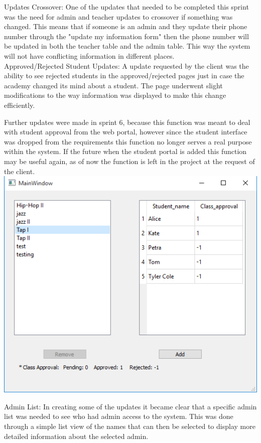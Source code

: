 Updates Crossover:
One of the updates that needed to be completed this sprint was the need for admin and teacher updates to crossover if something was changed. This means that if someone is an admin and they update their phone number through the "update my information form" then the phone number will be updated in both the teacher table and the admin table. This way the system will not have conflicting information in different places. \\

Approved/Rejected Student Updates:
A update requested by the client was the ability to see rejected students in the approved/rejected pages just in case the academy changed its mind about a student. The page underwent slight modifications to the way information was displayed to make this change efficiently. 

Further updates were made in sprint 6, because this function was meant to deal with student approval from the web portal, however since the student interface was dropped from the requirements this function no longer serves a real purpose within the system. If the future when the student portal is added this function may be useful again, as of now the function is left in the project at the request of the client.\\

\includegraphics[scale=0.5]{newAddStudent.png}

Admin List:
In creating some of the updates it became clear that a specific admin list was needed to see who had admin access to the system. This was done through a simple list view of the names that can then be selected to display more detailed information about the selected admin.\\


